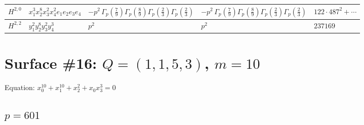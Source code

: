 \documentclass[11pt]{article}
\begin{document}
\begin{table}[ht]
{\begin{tabular}{@{}lllll@{}}
\midrule
$H^{2,0}$ & $x_{1}^{3} x_{2}^{8} x_{3}^{2} x_{4}^{2}  e_{1} e_{2} e_{3} e_{4}$ & $- p^{2} \, \Gamma_p \left( \frac{7}{9} \right) \Gamma_p \left( \frac{8}{9} \right) \Gamma_p \left( \frac{2}{3} \right) \Gamma_p \left( \frac{2}{3} \right)$ & $- p^{2} \, \Gamma_p \left( \frac{7}{9} \right) \Gamma_p \left( \frac{8}{9} \right) \Gamma_p \left( \frac{2}{3} \right) \Gamma_p \left( \frac{2}{3} \right)$ & $122{\cdot}487^{2}{+}\cdots$ \\
\midrule
$H^{2,2}$ & $y_{1}^{2} y_{2}^{8} y_{3}^{2} y_{4}^{3}$ & $p^{2} \,$ & $p^{2} \,$ & $237169$ \\
\bottomrule
\end{tabular}
}
\renewcommand{\arraystretch}{1.0}
\end{table}

\newpage

\section*{Surface \#16: $Q=(1, 1, 5, 3)$, $m=10$}

Equation: $x_0^{10} + x_1^{10} + x_2^{2} + x_0 x_3^{3} = 0$

\subsection*{$p = 601$}
\end{document}
